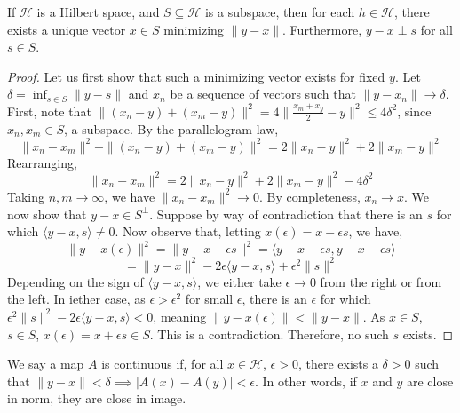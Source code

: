     \begin{theorem}
        If $\mathcal H$ is a Hilbert space, and $S \subseteq \mathcal H$ is a subspace, then 
        for each $h \in \mathcal H$, there exists a unique vector $x \in S$ minimizing 
        $\|y-x\|$. Furthermore, $y-x \perp s$ for all $s \in S$. 
    \end{theorem}
    \begin{proof}
        Let us first show that such a minimizing vector exists for fixed $y$. 
        Let $\delta = \inf_{s \in S}\|y-s\|$ and $x_n$ be a sequence of vectors such that 
        $\|y-x_n\| \to \delta$. First, note that $\|(x_n - y)+(x_m-y)\|^2 = 4\|\frac{x_m + x_y}{2} - y\|^2 \leq 4\delta^2$, since 
        $x_n, x_m \in S$, a subspace. By the parallelogram law, 
        \[ \|x_n - x_m\|^2 +  \|(x_n - y)+(x_m-y)\|^2 = 2\|x_n - y\|^2 + 2\|x_m - y\|^2 \]
        Rearranging, 
        \[  \|x_n - x_m\|^2 = 2\|x_n - y\|^2 + 2\|x_m - y\|^2 - 4 \delta^2 \]
        Taking $n,m \to \infty$, we have $\|x_n - x_m\|^2  \to 0$. By completeness, 
        $x_n \to x$. We now show that $y-x \in S^\perp$. Suppose by way of contradiction that 
        there is an $s$ for which $\langle y-x, s\rangle \neq 0$. Now observe that, letting 
        $x(\epsilon) = x - \epsilon s$, we have, 
        \[ \|y - x(\epsilon)\|^2 = \|y - x - \epsilon s\|^2 = \langle y-x-\epsilon s,y-x-\epsilon s\rangle  \]
        \[ = \|y-x\|^2 - 2\epsilon \langle y - x,  s\rangle + \epsilon^2 \|s\|^2 \]
        Depending on the sign of $\langle y - x,  s\rangle$, we either take $\epsilon \to 0$ from the right or from the left. 
        In iether case, as $\epsilon > \epsilon^2$ for small $\epsilon$, there is an $\epsilon$ for which 
        $\epsilon^2 \|s\|^2 - 2\epsilon \langle y - x,  s\rangle < 0$, meaning $\|y-x(\epsilon)\| < \|y-x\|$. 
        As $x \in S$, $s \in S$, $x(\epsilon) = x + \epsilon s \in S$. This is a contradiction. Therefore, no such 
        $s$ exists.
    \end{proof}

    We say a map $A$ is continuous if, for all $x \in \mathcal H$, $\epsilon > 0$, there exists a 
    $\delta > 0$ such that $\|y-x\|<\delta \implies |A(x)-A(y)| < \epsilon$. In other words, if 
    $x$ and $y$ are close in norm, they are close in image.

